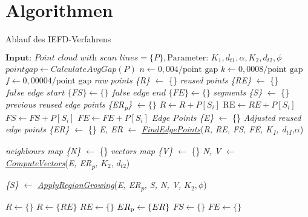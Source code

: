 \appendix
\chapter{Algorithmen} \label{Algorithmen}
\begin{algorithm}
	\caption{Ablauf des IEFD-Verfahrens}
	\label{alg: IEFD_Ablauf}
	\begin{algorithmic}[1]
		\State $\textbf{Input: } \textit{Point cloud with scan lines} = \{P\}, \text{Parameter: } K_1, d_{t1}, \alpha, K_2, d_{t2}, \phi$
		\State $point gap \gets CalculateAvgGap(P)$
		\State $n \gets 0,004/\text{point gap}$
		\State $k \gets 0,0008/\text{point gap}$
		\State $f \gets 0,00004/\text{point gap}$
		\State \textit{raw points \{R\}} $\gets$ \{\}
		\State \textit{reused points \{RE\}} $\gets$ \{\}
		\State $\textit{false edge start \{FS\}} \gets \{\}$
		\State $\textit{false edge end \{FE\}} \gets\{\}$
		\State \textit{segments \{S\}} $\gets$ \{\}
		\State \textit{previous reused edge points \{ER\textsubscript{p}\}} $\gets \{\}$
		\State $\textit{R} \gets \textit{R} + P[S_i]$
		\State$\text{RE} \gets \textit{RE} + P[S_i]$
		\EndIf
		\State $\textit{FS} \gets \textit{FS} + P[S_i]$
		\State $\textit{FE} \gets \textit{FE} + P[S_i]$
		\EndIf	
		\State \textit{Edge Points \{E\}} $\gets$ \{\}
		\State \textit{Adjusted reused edge points \{ER\}} $\gets$ \{\}
		\State \textit{E, ER} $\gets$ \textit{\hyperref[alg:find_edge_points]{FindEdgePoints}}(\textit{R, RE, FS, FE, K\textsubscript{1}, d\textsubscript{t1},}$\alpha$)
		
		\State \textit{neighbours map \{N\}} $\gets$ \{\}
		\State \textit{vectors map \{V\}} $\gets$ \{\}
		\State \textit{N, V} $\gets$ \textit{\hyperref[alg:compute_vectors]{ComputeVectors}}(\textit{E, ER\textsubscript{p},} $K_2$, $d_{t2}$)
		
		\State \textit{\{S\}} $\gets$ \textit{\hyperref[alg:apply_region_growing]{ApplyRegionGrowing}}(\textit{E, ER\textsubscript{p}, S, N, V, } $K_2, \phi$)
		
		\State $R \gets \{\}$
		\State $R \gets \{RE\}$
		\State $RE \gets \{\}$
		\State $ER\textsubscript{p} \gets \{ER\}$
		\State $FS \gets \{\}$
		\State $FE \gets \{\}$
		\EndIf
		\EndFor
		
		
	\end{algorithmic}
\end{algorithm}

